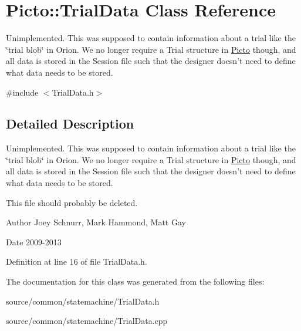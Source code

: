 \hypertarget{class_picto_1_1_trial_data}{\section{Picto\-:\-:Trial\-Data Class Reference}
\label{class_picto_1_1_trial_data}
}


Unimplemented. This was supposed to contain information about a trial like the \char`\"{}trial blob\char`\"{} in Orion. We no longer require a Trial structure in \hyperlink{namespace_picto}{Picto} though, and all data is stored in the Session file such that the designer doesn't need to define what data needs to be stored.  




{\ttfamily \#include $<$Trial\-Data.\-h$>$}



\subsection{Detailed Description}
Unimplemented. This was supposed to contain information about a trial like the \char`\"{}trial blob\char`\"{} in Orion. We no longer require a Trial structure in \hyperlink{namespace_picto}{Picto} though, and all data is stored in the Session file such that the designer doesn't need to define what data needs to be stored. 

This file should probably be deleted. \begin{DoxyAuthor}{Author}
Joey Schnurr, Mark Hammond, Matt Gay 
\end{DoxyAuthor}
\begin{DoxyDate}{Date}
2009-\/2013 
\end{DoxyDate}


Definition at line 16 of file Trial\-Data.\-h.



The documentation for this class was generated from the following files\-:\begin{DoxyCompactItemize}
\item 
source/common/statemachine/Trial\-Data.\-h\item 
source/common/statemachine/Trial\-Data.\-cpp\end{DoxyCompactItemize}
